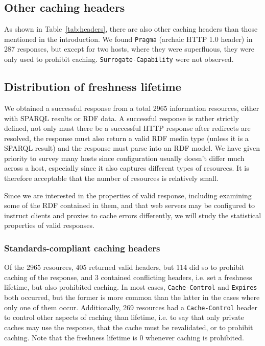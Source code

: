 \documentclass{llncs}
\newcommand{\httph}[1]{\texttt{#1}}
\begin{document}
\subsection{Other caching headers}

As shown in Table~\ref{tab:headers}, there are also other caching
headers than those mentioned in the introduction. We found
\httph{Pragma} (archaic HTTP 1.0 header) in 287 responses, but except
for two hosts, where they were superfluous, they were only used to
prohibit caching. \httph{Surrogate-Capability} were not observed.

\subsection{Distribution of freshness lifetime}

We obtained a successful response from a total 2965 information
resources, either with SPARQL results or RDF data. A successful
response is rather strictly defined, not only must there be a
successful HTTP response after redirects are resolved, the response
must also return a valid RDF media type (unless it is a SPARQL result)
and the response must parse into an RDF model. We have given priority
to survey many hosts since configuration usually doesn't differ much
across a host, especially since it also captures different types of
resources. It is therefore acceptable that the number of resources is
relatively small.


Since we are interested in the properties of valid response, including
examining some of the RDF contained in them, and that web servers may
be configured to instruct clients and proxies to cache errors
differently, we will study the statistical properties of valid
responses.

\subsubsection{Standards-compliant caching headers}

Of the 2965 resources, 405 returned valid headers, but 114 did so to
prohibit caching of the response, and 3 contained conflicting
headers, i.e. set a freshness lifetime, but also prohibited
caching. In most cases, \httph{Cache-Control} and \httph{Expires} both
occurred, but the former is more common than the latter in the cases
where only one of them occur.  Additionally, 269 resources had a
\httph{Cache-Control} header to control other aspects of caching than
lifetime, i.e. to say that only private caches may use the response,
that the cache must be revalidated, or to prohibit caching. 
Note that the freshness lifetime is 0 whenever caching is prohibited.
\end{document}
